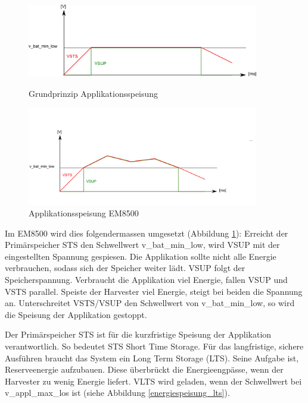 \begin{figure}[ht]
 \begin{minipage}[t]{0.5\textwidth}
   \includegraphics[width=0.9\textwidth]{2TheoretischeGrundlagen/imag/levelMitSTsTheoriel.png}
   \caption{Grundprinzip Applikationsspeisung }
   \label{em_grundprinzip} 
 \end{minipage}
 \begin{minipage}[t]{0.5\textwidth}
   \includegraphics[width=0.9\textwidth]{2TheoretischeGrundlagen/imag/levelSTSReal.png}
   \caption{Applikationsspeisung EM8500}
   \label{em_grundprinzip_em8500} 
 \end{minipage}
\end{figure}

Im EM8500 wird dies folgendermassen umgesetzt (Abbildung \ref{em_grundprinzip_em8500}): Erreicht der Primär\-speicher STS den Schwellwert v\_bat\_min\_low, wird VSUP mit der eingestellten Spannung gespiesen. Die Applikation sollte nicht alle Energie verbrauchen, sodass sich der Speicher weiter lädt.  VSUP folgt der Speicherspannung. Verbraucht die Applikation viel Energie, fallen VSUP und VSTS parallel. Speiste der Harvester viel Energie, steigt bei beiden die Spannung an. Unterschreitet VSTS/VSUP den Schwellwert von v\_bat\_min\_low, so wird die Speisung der Applikation gestoppt.

Der Primärspeicher STS ist für die kurzfristige Speisung der Applikation verantwortlich. So bedeutet STS Short Time Storage. Für das langfristige, sichere Ausführen braucht das System ein Long Term Storage (LTS). Seine Aufgabe ist, Reserveenergie aufzubauen. Diese überbrückt die Energieengpässe, wenn der Harvester zu wenig Energie liefert.
VLTS wird geladen, wenn der Schwellwert bei v\_appl\_max\_los ist (siehe Abbildung \ref{energiespeisung_lts}).

